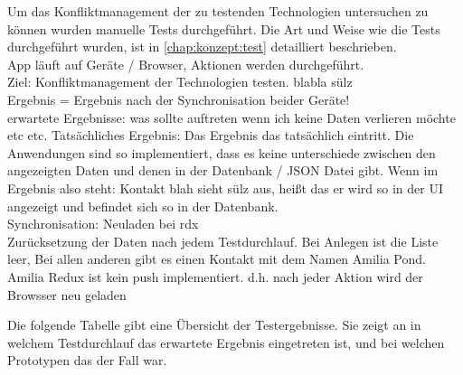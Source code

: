 Um das Konfliktmanagement der zu testenden Technologien untersuchen zu können wurden manuelle Tests durchgeführt.
Die Art und Weise wie die Tests durchgeführt wurden, ist in \autoref{chap:konzept:test} detailliert beschrieben.\\
App läuft auf Geräte / Browser, Aktionen werden durchgeführt.\\
Ziel: Konfliktmanagement der Technologien testen. blabla sülz\\
Ergebnis = Ergebnis nach der Synchronisation beider Geräte!\\ 
erwartete Ergebnisse: was sollte auftreten wenn ich keine Daten verlieren möchte etc etc.
Tatsächliches Ergebnis: Das Ergebnis das tatsächlich eintritt.
Die Anwendungen sind so implementiert, dass es keine unterschiede zwischen den angezeigten Daten und denen in der Datenbank / JSON Datei gibt.
Wenn im Ergebnis also steht: Kontakt blah sieht sülz aus, heißt das er wird so in der UI angezeigt und befindet sich so in der Datenbank.\\
Synchronisation: Neuladen bei rdx\\
Zurücksetzung der Daten nach jedem Testdurchlauf. Bei Anlegen ist die Liste leer, Bei allen anderen gibt es einen Kontakt mit dem Namen Amilia Pond.\\
Amilia Redux ist kein push implementiert. d.h. nach jeder Aktion wird der Browsser neu geladen
% 
% 
% 

%
%

%
%
%

% 
% 
% 
% 
Die folgende Tabelle gibt eine Übersicht der Testergebnisse. Sie zeigt an in welchem Testdurchlauf das erwartete Ergebnis eingetreten ist, und bei welchen Prototypen das der Fall war.
